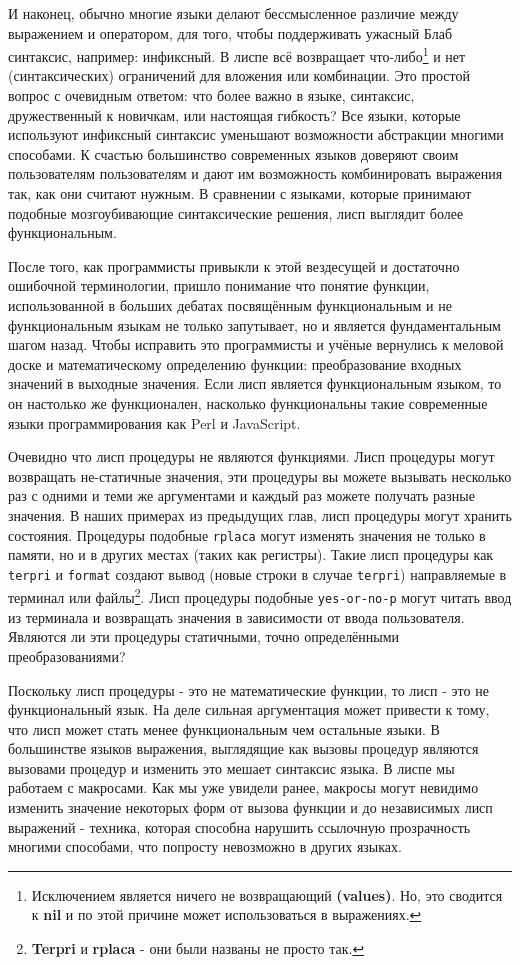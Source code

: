 И наконец, обычно многие языки делают бессмысленное различие между выражением и оператором, для того, чтобы поддерживать ужасный Блаб синтаксис, например: инфиксный. В лиспе всё возвращает что-либо\footnote{Исключением является ничего не возвращающий \textbf{(values)}. Но, это сводится к \textbf{nil} и по этой причине может использоваться в выражениях. } и нет (синтаксических) ограничений для вложения или комбинации. Это простой вопрос с очевидным ответом: что более важно в языке, синтаксис, дружественный к новичкам, или настоящая гибкость? Все языки, которые используют инфиксный синтаксис уменьшают возможности абстракции многими способами. К счастью большинство современных языков доверяют своим пользователям пользователям и дают им возможность комбинировать выражения так, как они считают нужным. В сравнении с языками, которые принимают подобные мозгоубивающие синтаксические решения, лисп выглядит более функциональным. 

После того, как программисты привыкли к этой вездесущей и достаточно ошибочной терминологии, пришло понимание что понятие функции, использованной в больших дебатах посвящённым функциональным и не функциональным языкам не только запутывает, но и является фундаментальным шагом назад. Чтобы исправить это программисты и учёные вернулись к меловой доске и математическому определению функции: преобразование входных значений в выходные значения. Если лисп является функциональным языком, то он настолько же функционален, насколько функциональны такие современные языки программирования как Perl и JavaScript. 

Очевидно что лисп процедуры не являются функциями. Лисп процедуры могут возвращать не-статичные значения, эти процедуры вы можете вызывать несколько раз с одними и теми же аргументами и каждый раз можете получать разные значения. В наших примерах из предыдущих глав, лисп процедуры могут хранить состояния. Процедуры подобные \verb"rplaca" могут изменять значения не только в памяти, но и в других местах (таких как регистры). Такие лисп процедуры как \verb"terpri" и \verb"format" создают вывод (новые строки в случае \verb"terpri") направляемые в терминал или файлы\footnote{\textbf{Terpri} и \textbf{rplaca} - они были названы не просто так.}. Лисп процедуры подобные \verb"yes-or-no-p" могут читать ввод из терминала и возвращать значения в зависимости от ввода пользователя. Являются ли эти процедуры статичными, точно определёнными преобразованиями? 

Поскольку лисп процедуры - это не математические функции, то лисп - это не функциональный язык. На деле сильная аргументация может привести к тому, что лисп может стать менее функциональным чем остальные языки. В большинстве языков выражения, выглядящие как вызовы процедур являются вызовами процедур и изменить это мешает синтаксис языка. В лиспе мы работаем с макросами. Как мы уже увидели ранее, макросы могут невидимо изменить значение некоторых форм от вызова функции и до независимых лисп выражений - техника, которая способна нарушить ссылочную прозрачность многими способами, что попросту невозможно в других языках.

